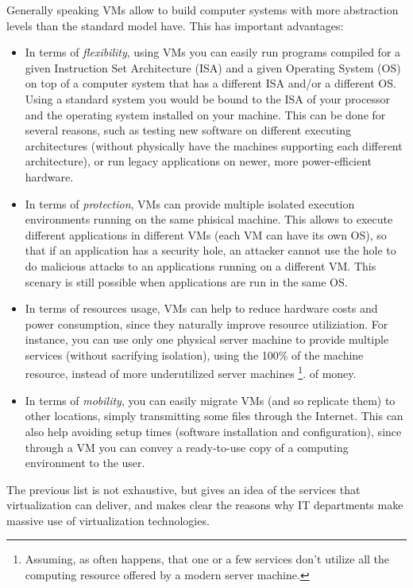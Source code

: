 Generally speaking VMs allow to build computer systems with more abstraction levels than the standard model have. This has important
advantages:
\begin{itemize}
  \item In terms of \emph{flexibility}, using VMs you can easily run programs compiled for a given Instruction Set Architecture (ISA) 
	and a given Operating System (OS) on top of a computer system that has a different ISA and/or a different OS. Using a standard
	system you would be bound to the ISA of your processor and the operating system installed on your machine. This can be 
	done for several reasons, such as testing new software on different executing architectures (without physically have the
	machines supporting each different architecture), or run legacy applications on newer, more power-efficient hardware.

  \item In terms of \emph{protection}, VMs can provide multiple isolated execution environments running on the same phisical machine.
	This allows to execute different applications in different VMs (each VM can have its own OS), so that if an application has a
	security hole, an attacker cannot use the hole to do malicious attacks to an applications running on a different VM. 
	This scenary is still possible when applications are run in the same OS.
	
  \item In terms of resources usage, VMs can help to reduce hardware costs and power consumption, since they naturally improve 
	resource utiliziation. For instance, you can use only one physical server machine to provide multiple services (without 
	sacrifying isolation), using the 100\% of the machine resource, instead of more underutilized server machines
	\footnote{Assuming, as often happens, that one or a few services don't utilize all the computing resource offered by
	a modern server machine.}.
	of money.
	
  \item In terms of \emph{mobility}, you can easily migrate VMs (and so replicate them) to other locations, simply transmitting 
	some files through the Internet. This can also help avoiding setup times (software installation and configuration), 
	since through a VM you can convey a ready-to-use copy of a computing environment to the user.
\end{itemize}

The previous list is not exhaustive, but gives an idea of the services that virtualization can deliver, and makes clear the reasons
why IT departments make massive use of virtualization technologies.



